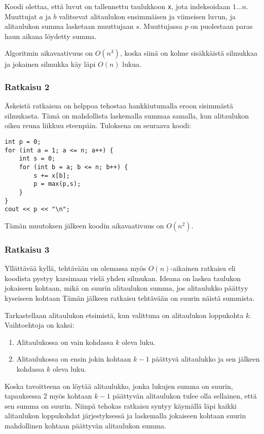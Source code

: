 Koodi olettaa, että luvut on tallennettu taulukkoon \texttt{x},
jota indeksoidaan $1 \ldots n$.
Muuttujat $a$ ja $b$ valitsevat alitaulukon ensimmäisen
ja viimeisen luvun, ja alitaulukon summa lasketaan muuttujaan $s$.
Muuttujassa $p$ on puolestaan paras haun aikana löydetty summa.

Algoritmin aikavaativuus on $O(n^3)$, koska siinä on kolme
sisäkkäistä silmukkaa ja jokainen silmukka käy läpi $O(n)$ lukua.

\subsubsection{Ratkaisu 2}

Äskeistä ratkaisua on helppoa tehostaa hankkiutumalla
eroon sisimmästä silmukasta.
Tämä on mahdollista laskemalla summaa samalla,
kun alitaulukon oikea reuna liikkuu eteenpäin.
Tuloksena on seuraava koodi:

\begin{lstlisting}
int p = 0;
for (int a = 1; a <= n; a++) {
    int s = 0;
    for (int b = a; b <= n; b++) {
        s += x[b];
        p = max(p,s);
    }
}
cout << p << "\n";
\end{lstlisting}
Tämän muutoksen jälkeen koodin aikavaativuus on $O(n^2)$.

\subsubsection{Ratkaisu 3}

Yllättävää kyllä, tehtävään on olemassa myös
$O(n)$-aikainen ratkaisu eli koodista pystyy
karsimaan vielä yhden silmukan.
Ideana on laskea taulukon jokaiseen
kohtaan, mikä on suurin alitaulukon
summa, jos alitaulukko päättyy kyseiseen kohtaan
Tämän jälkeen ratkaisu tehtävään on suurin
näistä summista.

Tarkastellaan alitaulukon etsimistä,
kun valittuna on alitaulukon loppukohta $k$.
Vaihtoehtoja on kaksi:
\begin{enumerate}
\item Alitaulukossa on vain kohdassa $k$ oleva luku.
\item Alitaulukossa on ensin jokin kohtaan $k-1$ päättyvä alitaulukko
ja sen jälkeen kohdassa $k$ oleva luku.
\end{enumerate}

Koska tavoitteena on löytää alitaulukko,
jonka lukujen summa on suurin,
tapauksessa 2 myös kohtaan $k-1$ päättyvän
alitaulukon tulee olla sellainen,
että sen summa on suurin.
Niinpä tehokas ratkaisu syntyy käymällä läpi
kaikki alitaulukon loppukohdat järjestyksessä
ja laskemalla jokaiseen kohtaan suurin
mahdollinen kohtaan päättyvän alitaulukon summa.

